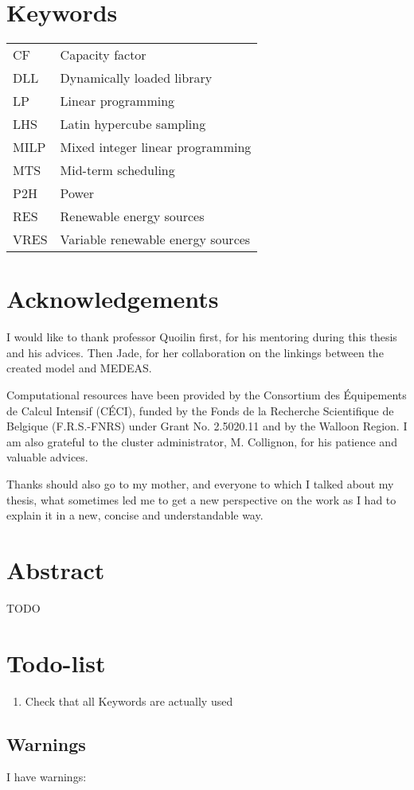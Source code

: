 \section*{Keywords}

\begin{table}[h!]
    \begin{tabular}{p{3cm} p{8cm}}
        CF & Capacity factor \\
        DLL & Dynamically loaded library \\
        LP & Linear programming \\
        LHS & Latin hypercube sampling \\
        MILP & Mixed integer linear programming \\
        MTS & Mid-term scheduling \\
        P2H & Power \\
        RES & Renewable energy sources \\
        VRES & Variable renewable energy sources \\
    \end{tabular}
\end{table}

\newpage

\section*{Acknowledgements}

I would like to thank professor Quoilin first, for his mentoring during this thesis and his advices. Then Jade, for her collaboration on the linkings between the created model and MEDEAS.

Computational resources have been provided by the Consortium des Équipements de Calcul Intensif (CÉCI), funded by the Fonds de la Recherche Scientifique de Belgique (F.R.S.-FNRS) under Grant No. 2.5020.11 and by the Walloon Region. I am also grateful to the cluster administrator, M. Collignon, for his patience and valuable advices.

Thanks should also go to my mother, and everyone to which I talked about my thesis, what sometimes led me to get a new perspective on the work as I had to explain it in a new, concise and understandable way.

\newpage

\section*{Abstract}

TODO

\section*{Todo-list}
\begin{enumerate}
    \item Check that all Keywords are actually used
\end{enumerate}

\newpage

\tableofcontents

\subsection*{Warnings}

I have  warnings:
\begin{itemize}
    \mylistwarnings{\item}
\end{itemize}

\newpage